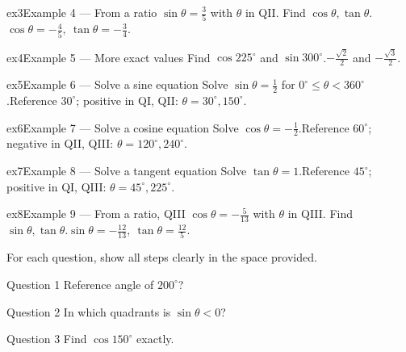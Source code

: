 \documentclass[11pt]{article}
\begin{document}
\begin{example}{ex3}{Example 4 --- From a ratio}
$\sin\theta=\tfrac35$ with $\theta$ in QII. Find $\cos\theta,\tan\theta$.\soln $\cos\theta=-\tfrac45,\ \tan\theta=-\tfrac34$.
\end{example}

\begin{example}{ex4}{Example 5 --- More exact values}
Find $\cos225^\circ$ and $\sin300^\circ$.\soln $-\tfrac{\sqrt2}{2}$ and $-\tfrac{\sqrt3}{2}$.
\end{example}

\begin{example}{ex5}{Example 6 --- Solve a sine equation}
Solve $\sin\theta=\tfrac12$ for $0^\circ\le\theta<360^\circ$.\soln Reference $30^\circ$; positive in QI, QII: $\theta=30^\circ,150^\circ$.
\end{example}

\begin{example}{ex6}{Example 7 --- Solve a cosine equation}
Solve $\cos\theta=-\tfrac12$.\soln Reference $60^\circ$; negative in QII, QIII: $\theta=120^\circ,240^\circ$.
\end{example}

\begin{example}{ex7}{Example 8 --- Solve a tangent equation}
Solve $\tan\theta=1$.\soln Reference $45^\circ$; positive in QI, QIII: $\theta=45^\circ,225^\circ$.
\end{example}

\begin{example}{ex8}{Example 9 --- From a ratio, QIII}
$\cos\theta=-\tfrac{5}{13}$ with $\theta$ in QIII. Find $\sin\theta,\tan\theta$.\soln $\sin\theta=-\tfrac{12}{13},\ \tan\theta=\tfrac{12}{5}$.
\end{example}

\clearpage
{}
For each question, show all steps clearly in the space provided.

\begin{qbox}{Question 1}
Reference angle of $200^\circ$?\workspace{2.4cm}
\end{qbox}

\begin{qbox}{Question 2}
In which quadrants is $\sin\theta<0$?\workspace{2.4cm}
\end{qbox}

\begin{qbox}{Question 3}
Find $\cos150^\circ$ exactly.\workspace{2.4cm}
\end{qbox}
\end{document}
